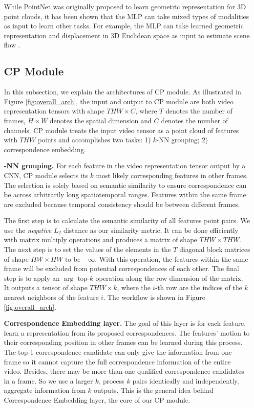 \documentclass[10pt,twocolumn,letterpaper]{article}
\begin{document}
While PointNet was originally proposed to learn geometric representation for 3D point clouds, it has been shown that the MLP can take mixed types of modalities as input to learn other tasks. For example, the MLP can take learned geometric representation and displacement in 3D Euclidean space as input to estimate scene flow \cite{FlowNet3D}.


\subsection{CP Module}

In this subsection, we explain the architectures of CP module. As illustrated in Figure \ref{fig:overall_arch}, the input and output to CP module are both video representation tensors with shape $THW\times C$, where $T$ denotes the number of frames, $H\times W$ denotes the spatial dimension and  $C$ denotes the number of channels. CP module treats the input video tensor as a point cloud of features with $THW$ points and accomplishes two tasks: 1) $k$-NN grouping; 2) correspondence embedding. 

\textbf{-NN grouping.} For each feature in the video representation tensor output by a CNN, CP module selects its $k$ most likely corresponding features in other frames. The selection is solely based on semantic similarity to ensure correspondence can be across arbitrarily long spatiotemporal ranges. Features within the same frame are excluded because temporal consistency should be between different frames.

The first step is to calculate the
semantic similarity of all features point pairs. 
We use the \textit{negative} $L_2$ distance as our similarity metric. 
It can be done efficiently with matrix multiply operations and produces a matrix of shape $THW\times THW$. 
The next step is to set the values of the elements in the $T$ diagonal block matrices of shape $HW\times HW$ to be $-\infty$. With this operation, the features within the same frame will be excluded from potential correspondences of each other. The final step is to apply an $\arg$ top-$k$ operation along the row dimension of the matrix. It outputs a tensor of shape $THW\times k$, where the $i$-th row are the indices of the $k$ nearest neighbors of the feature $i$. The workflow is shown in Figure \ref{fig:overall_arch}.

\textbf{Correspondence Embedding layer.} The goal of this layer is for each feature, learn a representation from its proposed correspondences.
The features' motion to their corresponding position in other frames can be learned during this process. 
The top-1 correspondence candidate can only give the information from one frame so it cannot capture the full correspondence information of the entire video. 
Besides, there may be more than one qualified correspondence candidates in a frame.
So we use a larger $k$, process $k$ pairs identically and independently, aggregate information from $k$ outputs. This is the general idea behind Correspondence Embedding layer, the core of our CP module.
\end{document}
